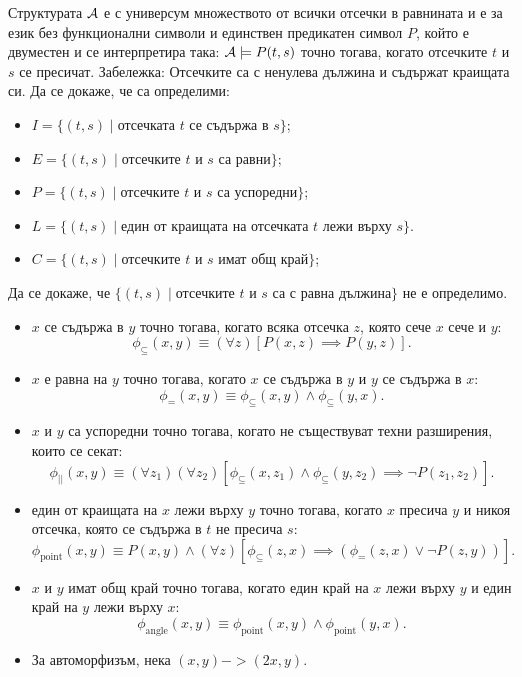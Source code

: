 \begin{problem}
  Структурата $\mathcal{A}$ е с универсум множеството от всички отсечки в равнината и е за език без функционални символи и
  единствен предикатен символ $P$, който е двуместен и се интерпретира така:
  $\mathcal{A} \models P(t,s)$ точно тогава, когато отсечките $t$ и $s$ се пресичат.
  Забележка: Отсечките са с ненулева дължина и съдържат краищата си.
  Да се докаже, че са определими:
\begin{itemize}
\item
  $I = \{(t, s) \mid \text{отсечката $t$ се съдържа в $s$}\}$;
\item
  $E = \{(t,s) \mid \text{отсечките $t$ и $s$ са равни}\}$;
\item
  $P = \{(t,s) \mid \text{отсечките $t$ и $s$ са успоредни}\}$;
\item
  $L = \{(t, s) \mid \text{един от краищата на отсечката $t$ лежи върху $s$}\}$.
\item
  $C = \{(t, s) \mid \text{отсечките $t$ и $s$ имат общ край}\}$;
\end{itemize}
Да се докаже, че $\{(t, s) \mid \text{отсечките $t$ и $s$ са с равна дължина}\}$ не е определимо.
\end{problem}
\begin{solution}
  \begin{itemize}
  \item
    $x$ се съдържа в $y$ точно тогава, когато всяка отсечка $z$, която сече $x$ сече и $y$:
    \[\phi_{\subseteq}(x,y) \equiv (\forall z)[P(x,z) \implies P(y,z)].\]
  \item
    $x$ е равна на $y$ точно тогава, когато $x$ се съдържа в $y$ и $y$ се съдържа в $x$:
    \[\phi_{=}(x,y) \equiv \phi_{\subseteq}(x,y) \land \phi_{\subseteq}(y,x).\]
  \item
    $x$ и $y$ са успоредни точно тогава, когато не съществуват техни разширения, които се секат:
    \[\phi_{||}(x,y) \equiv (\forall z_1)(\forall z_2)[\phi_{\subseteq}(x,z_1) \land \phi_{\subseteq}(y,z_2) \implies \neg P(z_1,z_2)].\]
  \item
    един от краищата на $x$ лежи върху $y$ точно тогава, когато $x$ пресича $y$ и никоя
    отсечка, която се съдържа в $t$ не пресича $s$:
    \[\phi_{\text{point}}(x,y) \equiv P(x,y) \land (\forall z)[\phi_{\subseteq}(z,x) \implies (\phi_{=}(z,x) \lor \neg P(z,y))].\]
  \item
    $x$ и $y$ имат общ край точно тогава, когато един край на $x$ лежи върху $y$ и един край на $y$ лежи върху $x$:
    \[\phi_{\text{angle}}(x,y) \equiv \phi_{\text{point}}(x,y) \land \phi_{\text{point}}(y,x).\]
  \item
    За автоморфизъм, нека $(x,y) -> (2x,y)$.
  \end{itemize}
\end{solution}

